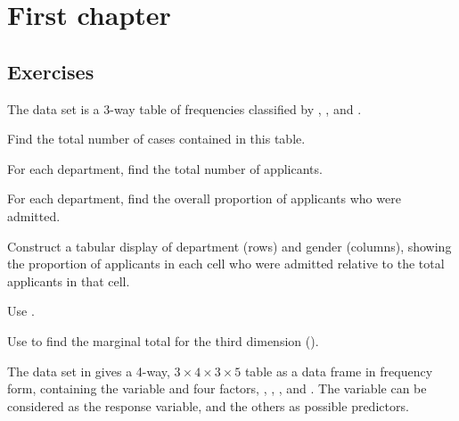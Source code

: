 \documentclass[10pt]{report}
\begin{document}
\chapter{First chapter}
\section{Exercises}

\begin{Exercises}

\exercise The data set  is a 3-way table of frequencies
classified by , , and .
  \begin{enumerate*}
    \item Find the total number of cases contained in this table.
    \item For each department, find the total number of applicants.
    \item For each department, find the overall proportion of applicants who were admitted.
    \item Construct a tabular display of department (rows) and gender (columns), showing
    the proportion of applicants in each cell who were admitted
    relative to the total applicants in that cell.
  \end{enumerate*}
\begin{answer}
	\begin{enumerate*}
		\item Use .
		\item Use  to find the marginal total for the third dimension ().
		\item
	\end{enumerate*}
\end{answer}

\exercise The data set  in  
gives a 4-way, $3 \times 4 \times 3 \times 5$ 
table as a data frame in
frequency form, containing the variable  and four factors,
,
,
, and
.  The variable  can be considered as the
response variable, and the others as possible predictors.


\end{Exercises}
\end{document}
